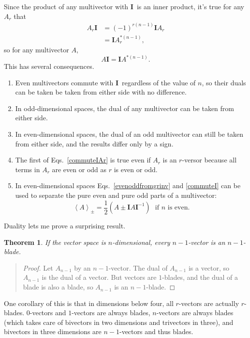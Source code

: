 \documentclass{utarticle}
\newcommand{\bl}[1]{\ensuremath{\bm{#1}}}
\newcommand{\I}{\bl{I}}
\newcommand{\grinv}[2][]{\ensuremath{#2^{*#1}}}
\newcommand{\grade}[2][]{\ensuremath{\left\langle #2 \right\rangle_{#1}}}
\newcommand{\half}{\ensuremath{\frac{1}{2}}}
\newtheorem{thm}{Theorem}
\newcommand{\bp}{\begin{quotation} \begin{proof}}
\newcommand{\ep}{\end{proof} \end{quotation}}
\begin{document}
Since the product of any multivector with \I\ is an inner product, it's true for any $A_r$ that
\begin{align} 
A_r \I & = (-1)^{r(n-1)} \I A_r \nonumber \\
          & = \I \grinv[(n-1)]{A_r},
\label{commuteIAr}
\end{align} 
so for any multivector $A$,
\begin{equation} A \I = \I \grinv[(n-1)]{A}. \label{commuteI} \end{equation}
This has several consequences.
\begin{enumerate}
\item Even multivectors commute with \I\ regardless of the value of $n$, so their duals can 
          be taken be taken from either side with no difference.  
\item In odd-dimensional spaces, the dual of any multivector can be taken from either side.
\item In even-dimensional spaces, the dual of an odd multivector can still be taken from 
          either side, and the results differ only by a sign.
\item The first of Eqs.~\eqref{commuteIAr} is true even if $A_r$ is an $r$-versor because all 
          terms in $A_r$ are even or odd as $r$ is even or odd.
\item In even-dimensional spaces Eqs.~\eqref{evenoddfromgrinv} and \eqref{commuteI} can be 
          used to separate the pure even and pure odd parts of a multivector:
          \begin{equation} \grade[\pm]{A} = \half(A \pm \I A \I^{-1})\ \ \ \text{if $n$ is even.} \end{equation}
\end{enumerate}

Duality lets me prove a surprising result.
\begin{thm}
If the vector space is $n$-dimensional, every $n-1$-vector is an $n-1$-blade.  
\label{vectorisblade}
\end{thm}
\bp
Let $A_{n-1}$ by an $n-1$-vector.  The dual of $A_{n-1}$ is a vector, so $A_{n-1}$ 
is the dual of a vector.  But vectors are $1$-blades, and the dual of a blade is also 
a blade, so $A_{n-1}$ is an $n-1$-blade.  
\ep
One corollary of this is that in dimensions below four, all $r$-vectors are actually
$r$-blades.  $0$-vectors and $1$-vectors are always blades, $n$-vectors
are always blades (which takes care of bivectors in two dimensions and trivectors in
three), and bivectors in three dimensions are $n-1$-vectors and thus blades.
\end{document}
